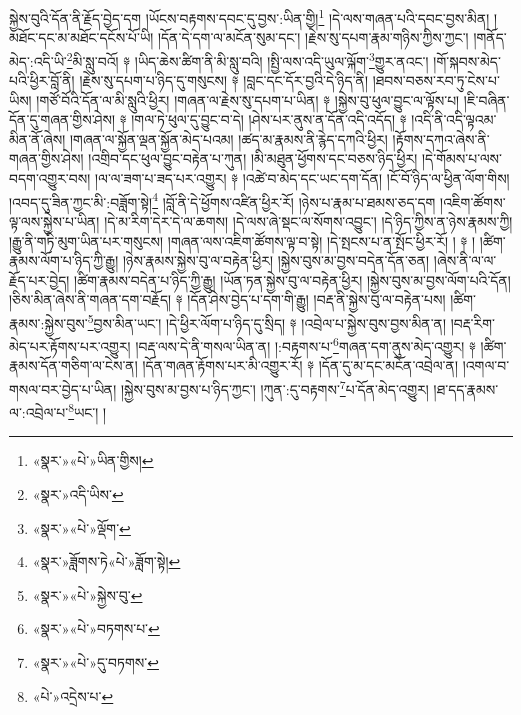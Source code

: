 སྐྱེས་བུའི་དོན་ནི་རྗོད་བྱེད་དག །ཡོངས་བརྟགས་དབང་དུ་བྱས་:ཡིན་གྱི།\footnote{«སྣར་»«པེ་»ཡིན་གྱིས།} །དེ་ལས་གཞན་པའི་དབང་བྱས་མིན། །མཐོང་དང་མ་མཐོང་དངོས་པོ་ཡི། །དོན་དེ་དག་ལ་མངོན་སུམ་དང་། །རྗེས་སུ་དཔག་རྣམ་གཉིས་ཀྱིས་ཀྱང་། །གནོད་མེད་:འདི་ཡི་\footnote{«སྣར་»འདི་ཡིས་}མི་སླུ་བའོ། ༈ །ཡིད་ཆེས་ཚིག་ནི་མི་སླུ་བའི། །སྤྱི་ལས་འདི་ཡུལ་ལྐོག་\footnote{«སྣར་»«པེ་»ལྡོག་}གྱུར་ནའང་། །གོ་སྐབས་མེད་པའི་ཕྱིར་བློ་ནི། །རྗེས་སུ་དཔག་པ་ཉིད་དུ་གསུངས། ༈ །བླང་དང་དོར་བྱའི་དེ་ཉིད་ནི། །ཐབས་བཅས་རབ་ཏུ་ངེས་པ་ཡིས། །གཙོ་བོའི་དོན་ལ་མི་སླུའི་ཕྱིར། །གཞན་ལ་རྗེས་སུ་དཔག་པ་ཡིན། ༈ །སྐྱེས་བུ་ཕུལ་བྱུང་ལ་ལྟོས་པ། །ཇི་བཞིན་དོན་དུ་གཞན་གྱིས་ཤེས། ༈ །གལ་ཏེ་ཕུལ་དུ་བྱུང་བ་དེ། །ཤེས་པར་ནུས་ན་དོན་འདི་འདོད། ༈ །འདི་ནི་འདི་ལྟའམ་མིན་ནོ་ཞེས། །གཞན་ལ་སྐྱོན་ལྡན་སྐྱོན་མེད་པའམ། །ཚད་མ་རྣམས་ནི་རྙེད་དཀའི་ཕྱིར། །རྟོགས་དཀའ་ཞེས་ནི་གཞན་གྱིས་ཤེས། །འགྲིབ་དང་ཕུལ་བྱུང་བརྟེན་པ་ཀུན། །མི་མཐུན་ཕྱོགས་དང་བཅས་ཉིད་ཕྱིར། །དེ་གོམས་པ་ལས་བདག་འགྱུར་བས། །ལ་ལ་ཟག་པ་ཟད་པར་འགྱུར། ༈ །འཚེ་བ་མེད་དང་ཡང་དག་དོན། །ངོ་བོ་ཉིད་ལ་ཕྱིན་ལོག་གིས། །འབད་དུ་ཟིན་ཀྱང་མི་:བཟློག་སྟེ།\footnote{«སྣར་»ཟློགས་ཏེ«པེ་»ཟློག་སྟེ།} །བློ་ནི་དེ་ཕྱོགས་འཛིན་ཕྱིར་རོ། །ཉེས་པ་རྣམ་པ་ཐམས་ཅད་དག །འཇིག་ཚོགས་ལྟ་ལས་སྐྱེས་པ་ཡིན། །དེ་མ་རིག་དེར་དེ་ལ་ཆགས། །དེ་ལས་ཞེ་སྡང་ལ་སོགས་འབྱུང་། །དེ་ཉིད་ཀྱིས་ན་ཉེས་རྣམས་ཀྱི། །རྒྱུ་ནི་གཏི་མུག་ཡིན་པར་གསུངས། །གཞན་ལས་འཇིག་ཚོགས་ལྟ་བ་སྟེ། །དེ་སྤངས་པ་ན་སྤོང་ཕྱིར་རོ། ། ༈ ། །ཚིག་རྣམས་ལོག་པ་ཉིད་ཀྱི་རྒྱུ། །ཉེས་རྣམས་སྐྱེས་བུ་ལ་བརྟེན་ཕྱིར། །སྐྱེས་བུས་མ་བྱས་བདེན་དོན་ཅན། །ཞེས་ནི་ལ་ལ་རྗོད་པར་བྱེད། །ཚིག་རྣམས་བདེན་པ་ཉིད་ཀྱི་རྒྱུ། །ཡོན་ཏན་སྐྱེས་བུ་ལ་བརྟེན་ཕྱིར། །སྐྱེས་བུས་མ་བྱས་ལོག་པའི་དོན། །ཅིས་མིན་ཞེས་ནི་གཞན་དག་བརྗོད། ༈ །དོན་ཤེས་བྱེད་པ་དག་གི་རྒྱུ། །བརྡ་ནི་སྐྱེས་བུ་ལ་བརྟེན་པས། །ཚིག་རྣམས་:སྐྱེས་བུས་\footnote{«སྣར་»«པེ་»སྐྱེས་བུ་}བྱས་མིན་ཡང་། །དེ་ཕྱིར་ལོག་པ་ཉིད་དུ་སྲིད། ༈ །འབྲེལ་པ་སྐྱེས་བུས་བྱས་མིན་ན། །བརྡ་རིག་མེད་པར་རྟོགས་པར་འགྱུར། །བརྡ་ལས་དེ་ནི་གསལ་ཡིན་ན། །:བརྟགས་པ་\footnote{«སྣར་»«པེ་»བཏགས་པ་}གཞན་དག་ནུས་མེད་འགྱུར། ༈ །ཚིག་རྣམས་དོན་གཅིག་ལ་ངེས་ན། །དོན་གཞན་རྟོགས་པར་མི་འགྱུར་རོ། ༈ །དོན་དུ་མ་དང་མངོན་འབྲེལ་ན། །འགལ་བ་གསལ་བར་བྱེད་པ་ཡིན། །སྐྱེས་བུས་མ་བྱས་པ་ཉིད་ཀྱང་། །ཀུན་:དུ་བརྟགས་\footnote{«སྣར་»«པེ་»དུ་བཏགས་}པ་དོན་མེད་འགྱུར། །ཐ་དད་རྣམས་ལ་:འབྲེལ་པ་\footnote{«པེ་»འདྲེས་པ་}ཡང་། །
